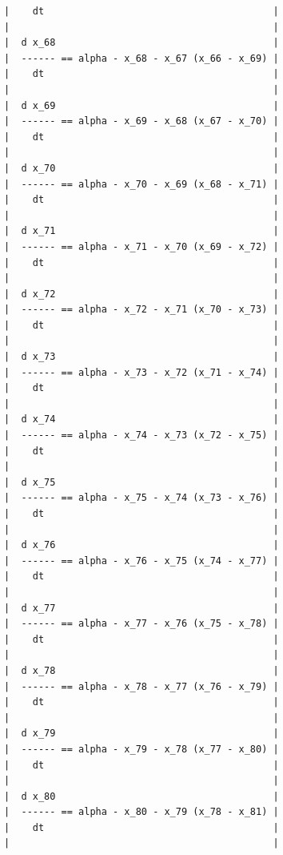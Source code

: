 {\begin{verbatim}
|    dt                                        |
|                                              |
|  d x_68                                      |
|  ------ == alpha - x_68 - x_67 (x_66 - x_69) |
|    dt                                        |
|                                              |
|  d x_69                                      |
|  ------ == alpha - x_69 - x_68 (x_67 - x_70) |
|    dt                                        |
|                                              |
|  d x_70                                      |
|  ------ == alpha - x_70 - x_69 (x_68 - x_71) |
|    dt                                        |
|                                              |
|  d x_71                                      |
|  ------ == alpha - x_71 - x_70 (x_69 - x_72) |
|    dt                                        |
|                                              |
|  d x_72                                      |
|  ------ == alpha - x_72 - x_71 (x_70 - x_73) |
|    dt                                        |
|                                              |
|  d x_73                                      |
|  ------ == alpha - x_73 - x_72 (x_71 - x_74) |
|    dt                                        |
|                                              |
|  d x_74                                      |
|  ------ == alpha - x_74 - x_73 (x_72 - x_75) |
|    dt                                        |
|                                              |
|  d x_75                                      |
|  ------ == alpha - x_75 - x_74 (x_73 - x_76) |
|    dt                                        |
|                                              |
|  d x_76                                      |
|  ------ == alpha - x_76 - x_75 (x_74 - x_77) |
|    dt                                        |
|                                              |
|  d x_77                                      |
|  ------ == alpha - x_77 - x_76 (x_75 - x_78) |
|    dt                                        |
|                                              |
|  d x_78                                      |
|  ------ == alpha - x_78 - x_77 (x_76 - x_79) |
|    dt                                        |
|                                              |
|  d x_79                                      |
|  ------ == alpha - x_79 - x_78 (x_77 - x_80) |
|    dt                                        |
|                                              |
|  d x_80                                      |
|  ------ == alpha - x_80 - x_79 (x_78 - x_81) |
|    dt                                        |
|                                              |

\end{verbatim}}
